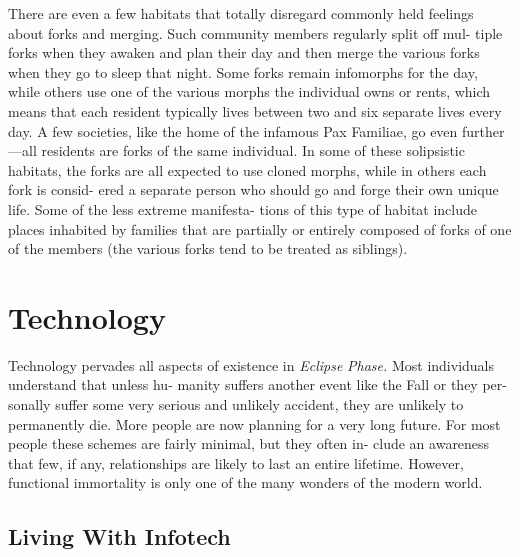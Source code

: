 There are even a few habitats that totally disregard 
commonly held feelings about forks and merging. 
Such community members regularly split off mul-
tiple forks when they awaken and plan their day 
and then merge the various forks when they go to 
sleep that night. Some forks remain infomorphs for 
the day, while others use one of the various morphs 
the individual owns or rents, which means that each 
resident typically lives between two and six separate 
lives every day. A few societies, like the home of the 
infamous Pax Familiae, go even further—all residents 
are forks of the same individual. In some of these 
solipsistic habitats, the forks are all expected to use 
cloned morphs, while in others each fork is consid-
ered a separate person who should go and forge their 
own unique life. Some of the less extreme manifesta-
tions of this type of habitat include places inhabited 
by families that are partially or entirely composed of 
forks of one of the members (the various forks tend to 
be treated as siblings).

\section{Technology}

Technology pervades all aspects of existence in \textit{Eclipse }
\textit{Phase.} Most individuals understand that unless hu-
manity suffers another event like the Fall or they per-
sonally suffer some very serious and unlikely accident, 
they are unlikely to permanently die. More people are 
now planning for a very long future. For most people 
these schemes are fairly minimal, but they often in-
clude an awareness that few, if any, relationships are 
likely to last an entire lifetime. However, functional 
immortality is only one of the many wonders of the 
modern world.

\subsection{Living With Infotech}

